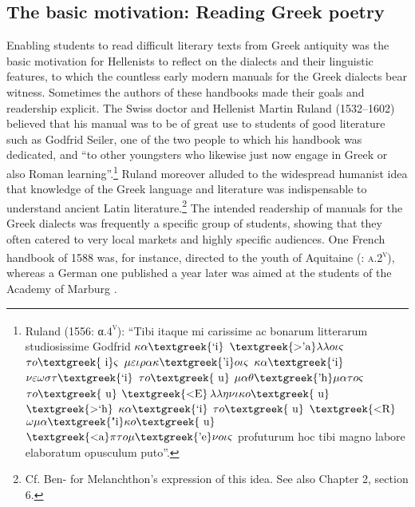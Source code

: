 \documentclass[output=paper]{langsci/langscibook}
\begin{document}
\subsection{The basic motivation: Reading Greek poetry}
\hypertarget{Toc19704819}{}
Enabling students to read difficult literary texts from Greek antiquity was the basic motivation for Hellenists to reflect on the dialects and their linguistic features, to which the countless early modern manuals for the Greek dialects bear witness. Sometimes the authors of these handbooks made their goals and readership explicit. The Swiss doctor and Hellenist Martin Ruland (1532–1602) believed that his manual was to be of great use to students of good literature such as Godfrid Seiler, one of the two people to which his handbook was dedicated, and “to other youngsters who likewise just now engage in Greek or also Roman learning”.\footnote{Ruland (1556: α.4\textsc{\textsuperscript{v}}): “Tibi itaque mi carissime ac bonarum litterarum studiosissime Godfrid $\kappa \alpha \text{\textgreek{`i}}$ $\text{\textgreek{>'a}}\lambda \lambda o\iota \varsigma $ $\tau o\text{\textgreek{~i}}\varsigma $ $\mu \varepsilon \iota \rho \alpha \kappa \text{\textgreek{'i}}o\iota \varsigma $ $\kappa \alpha \text{\textgreek{`i}}$ $\nu \varepsilon \omega \sigma \tau \text{\textgreek{`i}}$ $\tau o\text{\textgreek{~u}}$ $\mu \alpha \theta \text{\textgreek{'h}}\mu \alpha \tau o\varsigma $ $\tau o\text{\textgreek{~u}}$ $\text{\textgreek{<E}}$$\lambda \lambda \eta \nu \iota \kappa o\text{\textgreek{~u}}$ $\text{\textgreek{>`h}}$ $\kappa \alpha \text{\textgreek{`i}}$ $\tau o\text{\textgreek{~u}}$ $\text{\textgreek{<R}}$$\omega \mu \alpha \text{\textgreek{"i}}\kappa o\text{\textgreek{~u}}$ $\text{\textgreek{<a}}\pi \tau o\mu \text{\textgreek{'e}}\nu o\iota \varsigma $ profuturum hoc tibi magno labore elaboratum opusculum puto”.} Ruland moreover alluded to the widespread humanist idea that knowledge of the Greek language and literature was indispensable to understand ancient Latin literature.\footnote{Cf. Ben-\citet[139]{Tov2009} for Melanchthon’s expression of this idea. See also Chapter 2, section 6.} The intended readership of manuals for the Greek dialects was frequently a specific group of students, showing that they often catered to very local markets and highly specific audiences. One French handbook of 1588 was, for instance, directed to the youth of Aquitaine (\citealt{Baile1588}: \textsc{a.2}\textsc{\textsuperscript{v}}), whereas a German one published a year later was aimed at the students of the Academy of Marburg \citep{Walper1589}.
\end{document}
